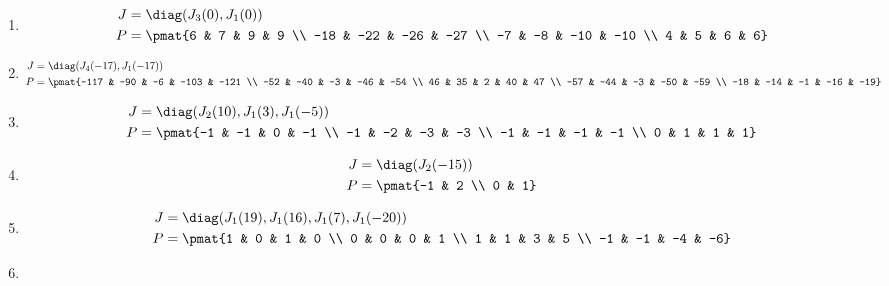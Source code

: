 \begin{enumerate}
\item

\begin{align*}
J &= \diag(J_{3}(0), J_{1}(0))\\
P &= \pmat{6 & 7 & 9 & 9 \\ -18 & -22 & -26 & -27 \\ -7 & -8 & -10 & -10 \\ 4 & 5 & 6 & 6}
\end{align*}

\item

\begin{align*}
J &= \diag(J_{4}(-17), J_{1}(-17))\\
P &= \pmat{-117 & -90 & -6 & -103 & -121 \\ -52 & -40 & -3 & -46 & -54 \\ 46 & 35 & 2 & 40 & 47 \\ -57 & -44 & -3 & -50 & -59 \\ -18 & -14 & -1 & -16 & -19}
\end{align*}

\item

\begin{align*}
J &= \diag(J_{2}(10), J_{1}(3), J_{1}(-5))\\
P &= \pmat{-1 & -1 & 0 & -1 \\ -1 & -2 & -3 & -3 \\ -1 & -1 & -1 & -1 \\ 0 & 1 & 1 & 1}
\end{align*}

\item

\begin{align*}
J &= \diag(J_{2}(-15))\\
P &= \pmat{-1 & 2 \\ 0 & 1}
\end{align*}

\item

\begin{align*}
J &= \diag(J_{1}(19), J_{1}(16), J_{1}(7), J_{1}(-20))\\
P &= \pmat{1 & 0 & 1 & 0 \\ 0 & 0 & 0 & 1 \\ 1 & 1 & 3 & 5 \\ -1 & -1 & -4 & -6}
\end{align*}

\item


\end{enumerate}

